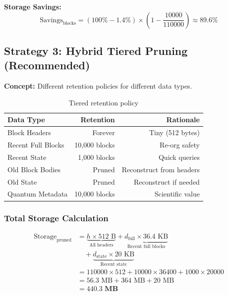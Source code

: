 \documentclass[11pt,a4paper]{article}
\begin{document}
\textbf{Storage Savings:}
\begin{equation}
\text{Savings}_{\text{blocks}} = (100\% - 1.4\%) \times \left(1 - \frac{10000}{110000}\right) \approx 89.6\%
\end{equation}

\subsection{Strategy 3: Hybrid Tiered Pruning (Recommended)}

\textbf{Concept:} Different retention policies for different data types.

\begin{table}[h]
\centering
\begin{tabular}{lrr}
\toprule
\textbf{Data Type} & \textbf{Retention} & \textbf{Rationale} \\
\midrule
Block Headers & Forever & Tiny (512 bytes) \\
Recent Full Blocks & 10,000 blocks & Re-org safety \\
Recent State & 1,000 blocks & Quick queries \\
Old Block Bodies & Pruned & Reconstruct from headers \\
Old State & Pruned & Reconstruct if needed \\
Quantum Metadata & 10,000 blocks & Scientific value \\
\bottomrule
\end{tabular}
\caption{Tiered retention policy}
\end{table}

\subsubsection{Total Storage Calculation}

\begin{align}
\text{Storage}_{\text{pruned}} &= \underbrace{h \times 512\text{ B}}_{\text{All headers}} + \underbrace{d_{\text{full}} \times 36.4\text{ KB}}_{\text{Recent full blocks}} \nonumber \\
&\quad + \underbrace{d_{\text{state}} \times 20\text{ KB}}_{\text{Recent state}} \\
&= 110000 \times 512 + 10000 \times 36400 + 1000 \times 20000 \nonumber \\
&= 56.3\text{ MB} + 364\text{ MB} + 20\text{ MB} \nonumber \\
&= \mathbf{440.3\text{ MB}}
\end{align}
\end{document}
